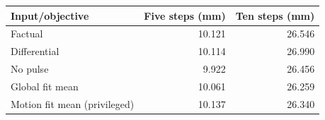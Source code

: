 \begin{tabular}{lrr}
\toprule
Input/objective & Five steps (mm) & Ten steps (mm)\\
\midrule
Factual & 10.121 & 26.546\\
Differential & 10.114 & 26.990\\
No pulse & 9.922 & 26.456\\
Global fit mean & 10.061 & 26.259\\
Motion fit mean (privileged) & 10.137 & 26.340\\
\bottomrule
\end{tabular}
